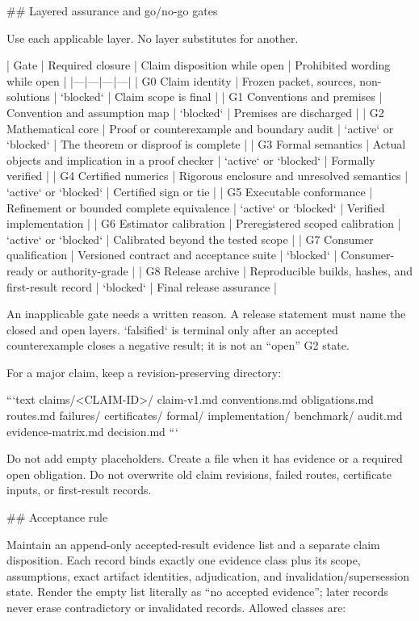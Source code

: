 \documentclass[11pt]{article}
\begin{document}
\begin{markdown}
## Layered assurance and go/no-go gates

Use each applicable layer. No layer substitutes for another.

| Gate | Required closure | Claim disposition while open | Prohibited wording while open |
|---|---|---|---|
| G0 Claim identity | Frozen packet, sources, non-solutions | `blocked` | Claim scope is final |
| G1 Conventions and premises | Convention and assumption map | `blocked` | Premises are discharged |
| G2 Mathematical core | Proof or counterexample and boundary audit | `active` or `blocked` | The theorem or disproof is complete |
| G3 Formal semantics | Actual objects and implication in a proof checker | `active` or `blocked` | Formally verified |
| G4 Certified numerics | Rigorous enclosure and unresolved semantics | `active` or `blocked` | Certified sign or tie |
| G5 Executable conformance | Refinement or bounded complete equivalence | `active` or `blocked` | Verified implementation |
| G6 Estimator calibration | Preregistered scoped calibration | `active` or `blocked` | Calibrated beyond the tested scope |
| G7 Consumer qualification | Versioned contract and acceptance suite | `blocked` | Consumer-ready or authority-grade |
| G8 Release archive | Reproducible builds, hashes, and first-result record | `blocked` | Final release assurance |

An inapplicable gate needs a written reason. A release statement must name the closed and open
layers. `falsified` is terminal only after an accepted counterexample closes a negative result; it
is not an “open” G2 state.

For a major claim, keep a revision-preserving directory:

```text
claims/<CLAIM-ID>/
  claim-v1.md
  conventions.md
  obligations.md
  routes.md
  failures/
  certificates/
  formal/
  implementation/
  benchmark/
  audit.md
  evidence-matrix.md
  decision.md
```

Do not add empty placeholders. Create a file when it has evidence or a required open obligation.
Do not overwrite old claim revisions, failed routes, certificate inputs, or first-result records.

## Acceptance rule

Maintain an append-only accepted-result evidence list and a separate claim disposition. Each
record binds exactly one evidence class plus its scope, assumptions, exact artifact identities,
adjudication, and invalidation/supersession state. Render the empty list literally as “no accepted
evidence”; later records never erase contradictory or invalidated records. Allowed classes are:


\end{markdown}
\end{document}
